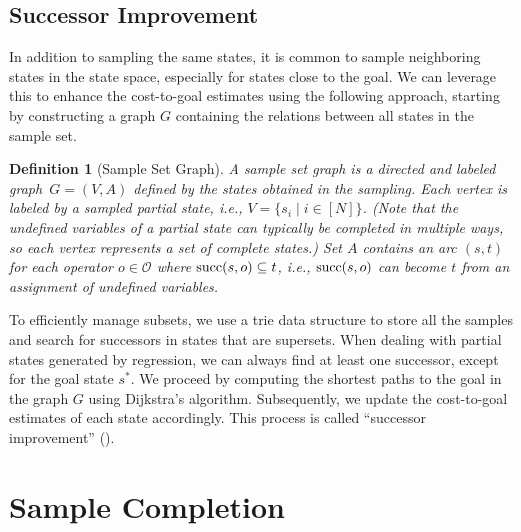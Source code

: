 \documentclass[ppgc,diss,english]{iiufrgs}
\newtheorem{definition}{Definition}
\begin{document}
\subsection{Successor Improvement}
\label{sec:sample-sui}
In addition to sampling the same states, it is common to sample neighboring states in the state space, especially for states close to the goal. We can leverage this to enhance the cost-to-goal estimates using the following approach, starting by constructing a graph $G$ containing the relations between all states in the sample set.
%
\begin{definition}[Sample Set Graph]\label{def:graph}
A sample set graph is a directed and labeled graph~$G = (V, A)$ defined by the states obtained in the sampling. Each vertex is labeled by a sampled partial state, i.e., $V = \{s_i \mid i \in [N]\}$. (Note that the undefined variables of a partial state can typically be completed in multiple ways, so each vertex represents a set of complete states.) Set $A$ contains an arc $(s,t)$ for each operator $o \in \mathcal{O}$ where $\operatorname{succ}(s,o) \subseteq t$, i.e., $\operatorname{succ}(s,o)$ can become $t$ from an assignment of undefined variables.
\end{definition}

To efficiently manage subsets, we use a trie data structure to store all the samples and search for successors in states that are supersets. When dealing with partial states generated by regression, we can always find at least one successor, except for the goal state $s^{*}$. We proceed by computing the shortest paths to the goal in the graph $G$ using Dijkstra's algorithm. Subsequently, we update the cost-to-goal estimates of each state accordingly. This process is called ``successor improvement'' (\sui).


\section{Sample Completion}
\label{sec:sample-completion}
\end{document}
